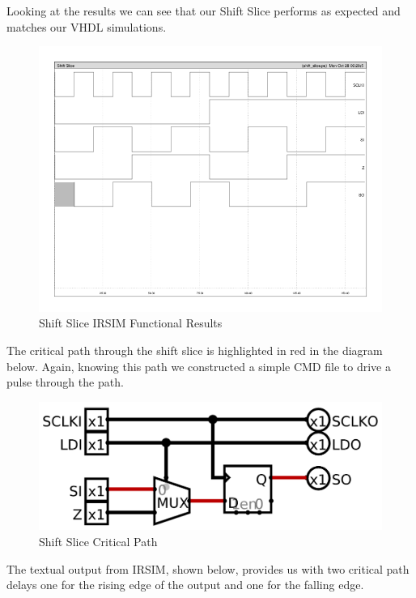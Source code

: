         

        Looking at the results we can see that our Shift Slice performs as
        expected and matches our VHDL simulations.

        \begin{figure}[H]
            \centering
            \includegraphics[width=0.75\linewidth]{../../irsim/shift_slice.png}
            \caption{Shift Slice IRSIM Functional Results}
        \end{figure}

        \newpage

        The critical path through the shift slice is highlighted in red in the
        diagram below. Again, knowing this path we constructed a simple CMD
        file to drive a pulse through the path.

        \begin{figure}[H]
            \centering
            \includegraphics[width=\linewidth]{../../logisim/shift_slice_crit_path.png}
            \caption{Shift Slice Critical Path}
        \end{figure}

        The textual output from IRSIM, shown below, provides us with two
        critical path delays one for the rising edge of the output and one for
        the falling edge.

